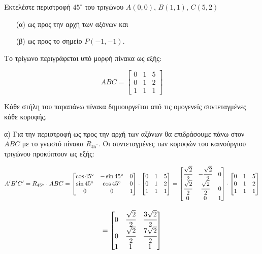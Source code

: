 \begin{example}
Εκτελέστε περιστροφή $45^\circ$ του τριγώνου $A(0, 0)$, $B(1, 1)$, $C(5, 2)$ 
\begin{enumerate}
    \item[(α)] ως προς την αρχή των αξόνων και 
    \item[(β)] ως προς το σημείο $P(-1, -1)$.
\end{enumerate}
\end{example}


\begin{solution}
Το τρίγωνο περιγράφεται υπό μορφή πίνακα ως εξής:


\[
ABC =
\begin{bmatrix}
0 & 1 & 5 \\
0 & 1 & 2 \\
1 & 1 & 1
\end{bmatrix}
\]

Κάθε στήλη του παραπάνω πίνακα δημιουργείται από τις ομογενείς συντεταγμένες κάθε κορυφής.

α) Για την περιστροφή ως προς την αρχή των αξόνων θα επιδράσουμε πάνω στον $ABC$ με το γνωστό πίνακα $R_{45^\circ}$. Οι συντεταγμένες των κορυφών του καινούργιου τριγώνου προκύπτουν ως εξής:

\[
A'B'C' = R_{45^\circ} \cdot ABC =
\begin{bmatrix}
\cos 45^\circ & -\sin 45^\circ & 0 \\
\sin 45^\circ & \cos 45^\circ & 0 \\
0 & 0 & 1
\end{bmatrix}
\cdot
\begin{bmatrix}
0 & 1 & 5 \\
0 & 1 & 2 \\
1 & 1 & 1
\end{bmatrix}
=
\begin{bmatrix}
\cfrac{\sqrt{2}}{2} & -\cfrac{\sqrt{2}}{2} & 0 \\
\cfrac{\sqrt{2}}{2} & \cfrac{\sqrt{2}}{2} & 0 \\
0 & 0 & 1
\end{bmatrix}
\cdot
\begin{bmatrix}
0 & 1 & 5 \\
0 & 1 & 2 \\
1 & 1 & 1
\end{bmatrix}
\]

\[
=
\begin{bmatrix}
0 & \cfrac{\sqrt{2}}{2} & \cfrac{3\sqrt{2}}{2} \\
0 & \cfrac{\sqrt{2}}{2} & \cfrac{7\sqrt{2}}{2} \\
1 & 1 & 1
\end{bmatrix}
\]


\end{solution}
